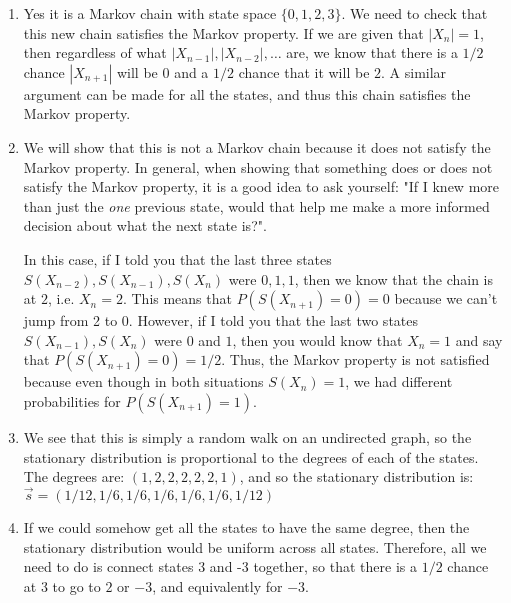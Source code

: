 \documentclass[11.5pt]{article}
\begin{document}
\begin{solution}{5.5} 
\vspace{-0.5em}
\begin{enumerate}
\item Yes it is a Markov chain with state space $\{0, 1, 2, 3\}$. We need to check that this new chain satisfies the Markov property. If we are given that $|X_n| = 1$, then regardless of what $|X_{n-1}|, |X_{n-2}|, \ldots$ are, we know that there is a $1/2$ chance $|X_{n+1}|$ will be 0 and a $1/2$ chance that it will be $2$. A similar argument can be made for all the states, and thus this chain satisfies the Markov property. 

\item We will show that this is not a Markov chain because it does not satisfy the Markov property. In general, when showing that something does or does not satisfy the Markov property, it is a good idea to ask yourself: "If I knew more than just the \textit{one} previous state, would that help me make a more informed decision about what the next state is?". 

In this case, if I told you that the last three states $S(X_{n-2}), S(X_{n-1}), S(X_n)$ were $0,1,1$, then we know that the chain is at $2$, i.e. $X_n = 2$. This means that $P(S(X_{n+1}) = 0) = 0$ because we can't jump from 2 to 0. However, if I told you that the last two states $S(X_{n-1}), S(X_n)$ were $0$ and $1$, then you would know that $X_n = 1$ and say that $P(S(X_{n+1}) = 0) = 1/2$. Thus, the Markov property is not satisfied because even though in both situations $S(X_n) = 1$, we had different probabilities for $P(S(X_{n+1}) = 1)$. 

\item We see that this is simply a random walk on an undirected graph, so the stationary distribution is proportional to the degrees of each of the states. The degrees are: $(1, 2, 2, 2, 2, 2, 1)$, and so the stationary distribution is: $\vec{s} = (1/12, 1/6, 1/6, 1/6, 1/6, 1/6, 1/12)$ 

\item If we could somehow get all the states to have the same degree, then the stationary distribution would be uniform across all states. Therefore, all we need to do is connect states 3 and -3 together, so that there is a $1/2$ chance at 3 to go to $2$ or $-3$, and equivalently for $-3$. 
\end{enumerate}
\end{solution} 

\pagebreak
\end{document}
